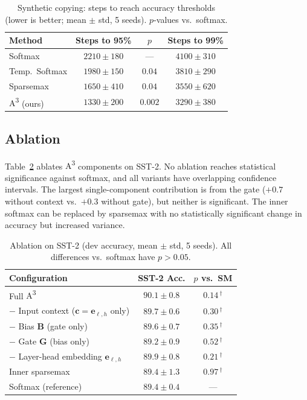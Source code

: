 \documentclass[11pt]{article}
\newcommand{\AAA}{\textsc{A\textsuperscript{3}}}
\newcommand{\bG}{\mathbf{G}}
\newcommand{\bB}{\mathbf{B}}
\newcommand{\bc}{\mathbf{c}}
\newcommand{\be}{\mathbf{e}}
\newcommand{\warn}[1]{\textcolor{warncolor}{#1}}
\begin{document}
\begin{table}[H]
\centering
\caption{Synthetic copying: steps to reach accuracy thresholds (lower is better; mean $\pm$ std, 5 seeds). $p$-values vs.\ softmax.}
\label{tab:copy}
\begin{tabular}{lccc}
\toprule
\textbf{Method} & \textbf{Steps to 95\%} & \textbf{$p$} & \textbf{Steps to 99\%} \\
\midrule
Softmax          & $2210 \pm 180$ & ---       & $4100 \pm 310$ \\
Temp.\ Softmax   & $1980 \pm 150$ & $0.04$    & $3810 \pm 290$ \\
Sparsemax        & $1650 \pm 410$ & $0.04$    & $3550 \pm 620$ \\
\AAA{} (ours)    & $1330 \pm 200$ & $0.002$   & $3290 \pm 380$ \\
\bottomrule
\end{tabular}
\end{table}

\subsection{Ablation}

Table~\ref{tab:ablation} ablates \AAA{} components on SST-2. No ablation reaches statistical significance against softmax, and all variants have overlapping confidence intervals. The largest single-component contribution is from the gate ($+0.7$ without context vs.\ $+0.3$ without gate), but neither is significant. The inner softmax can be replaced by sparsemax with no statistically significant change in accuracy but increased variance.

\begin{table}[H]
\centering
\caption{Ablation on SST-2 (dev accuracy, mean $\pm$ std, 5 seeds). All differences vs.\ softmax have $p > 0.05$.}
\label{tab:ablation}
\begin{tabular}{lcc}
\toprule
\textbf{Configuration} & \textbf{SST-2 Acc.} & \textbf{$p$ vs.\ SM} \\
\midrule
Full \AAA{}                               & $90.1 \pm 0.8$ & \warn{$0.14\,^\dagger$} \\
$-$ Input context ($\bc = \be_{\ell,h}$ only) & $89.7 \pm 0.6$ & \warn{$0.30\,^\dagger$} \\
$-$ Bias $\bB$ (gate only)                & $89.6 \pm 0.7$ & \warn{$0.35\,^\dagger$} \\
$-$ Gate $\bG$ (bias only)                & $89.2 \pm 0.9$ & \warn{$0.52\,^\dagger$} \\
$-$ Layer-head embedding $\be_{\ell,h}$   & $89.9 \pm 0.8$ & \warn{$0.21\,^\dagger$} \\
Inner sparsemax                           & $89.4 \pm 1.3$ & \warn{$0.97\,^\dagger$} \\
\midrule
Softmax (reference)                       & $89.4 \pm 0.4$ & --- \\
\bottomrule
\end{tabular}
\end{table}
\end{document}

